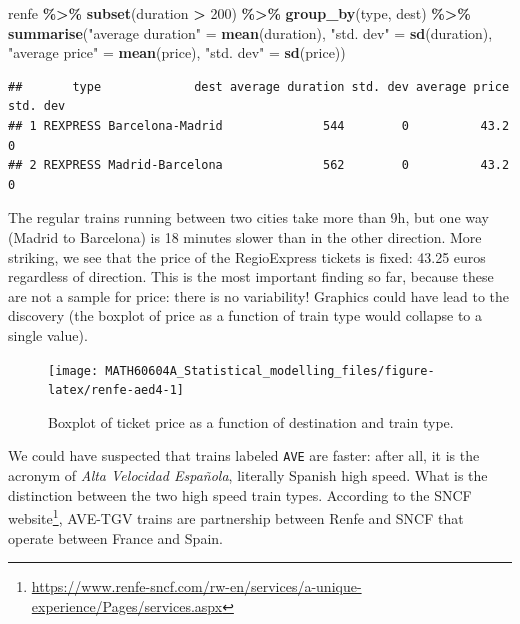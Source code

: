 \documentclass[
  11pt,
  letterpaper,
]{book}
\newenvironment{Shaded}{\begin{snugshade}}{\end{snugshade}}
\newcommand{\DecValTok}[1]{\textcolor[rgb]{0.00,0.00,0.81}{#1}}
\newcommand{\KeywordTok}[1]{\textcolor[rgb]{0.13,0.29,0.53}{\textbf{#1}}}
\newcommand{\NormalTok}[1]{#1}
\newcommand{\OperatorTok}[1]{\textcolor[rgb]{0.81,0.36,0.00}{\textbf{#1}}}
\newcommand{\StringTok}[1]{\textcolor[rgb]{0.31,0.60,0.02}{#1}}
\renewcommand{\href}[2]{#2\footnote{\url{#1}}}
\theoremstyle{definition}
\theoremstyle{definition}
\theoremstyle{definition}
\theoremstyle{remark}
\begin{document}
\begin{Shaded}
\begin{Highlighting}[]
\NormalTok{renfe }\OperatorTok{\%\textgreater{}\%}\StringTok{ }
\StringTok{  }\KeywordTok{subset}\NormalTok{(duration }\OperatorTok{\textgreater{}}\StringTok{ }\DecValTok{200}\NormalTok{) }\OperatorTok{\%\textgreater{}\%}\StringTok{ }
\StringTok{  }\KeywordTok{group\_by}\NormalTok{(type, dest) }\OperatorTok{\%\textgreater{}\%}\StringTok{ }
\StringTok{  }\KeywordTok{summarise}\NormalTok{(}\StringTok{"average duration"}\NormalTok{ =}\StringTok{ }\KeywordTok{mean}\NormalTok{(duration), }
            \StringTok{"std. dev"}\NormalTok{ =}\StringTok{ }\KeywordTok{sd}\NormalTok{(duration),}
            \StringTok{"average price"}\NormalTok{ =}\StringTok{ }\KeywordTok{mean}\NormalTok{(price), }
            \StringTok{"std. dev"}\NormalTok{ =}\StringTok{ }\KeywordTok{sd}\NormalTok{(price)) }
\end{Highlighting}
\end{Shaded}

\begin{verbatim}
##       type             dest average duration std. dev average price std. dev
## 1 REXPRESS Barcelona-Madrid              544        0          43.2        0
## 2 REXPRESS Madrid-Barcelona              562        0          43.2        0
\end{verbatim}

The regular trains running between two cities take more than 9h, but one way (Madrid to Barcelona) is 18 minutes slower than in the other direction. More striking, we see that the price of the RegioExpress tickets is fixed: 43.25 euros regardless of direction. This is the most important finding so far, because these are not a sample for price: there is no variability! Graphics could have lead to the discovery (the boxplot of price as a function of train type would collapse to a single value).

\begin{figure}

{\centering \texttt{[image: MATH60604A\_Statistical\_modelling\_files/figure-latex/renfe-aed4-1]} 

}

\caption{Boxplot of ticket price as a function of destination and train type.}\label{fig:renfe-aed4}
\end{figure}

We could have suspected that trains labeled \texttt{AVE} are faster: after all, it is the acronym of \emph{Alta Velocidad Española}, literally Spanish high speed. What is the distinction between the two high speed train types. According to the \href{https://www.renfe-sncf.com/rw-en/services/a-unique-experience/Pages/services.aspx}{SNCF website}, AVE-TGV trains are partnership between Renfe and SNCF that operate between France and Spain.
\end{document}
